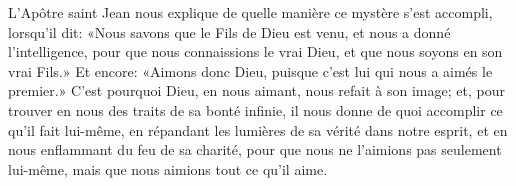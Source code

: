 L’Apôtre saint Jean nous explique de quelle manière ce mystère s’est accompli,
	lorsqu’il dit: «Nous savons que le Fils de Dieu est venu,
	et nous a donné l’intelligence, pour que nous connaissions le vrai Dieu,
	et que nous soyons en son vrai Fils.»
Et encore: «Aimons donc Dieu, puisque c’est lui qui nous a aimés le premier.»
C’est pourquoi Dieu, en nous aimant, nous refait à son image;
	et, pour trouver en nous des traits de sa bonté infinie,
	il nous donne de quoi accomplir ce qu’il fait lui-même,
	en répandant les lumières de sa vérité dans notre esprit,
	et en nous enflammant du feu de sa charité,
	pour que nous ne l’aimions pas seulement lui-même,
	mais que nous aimions tout ce qu’il aime.
